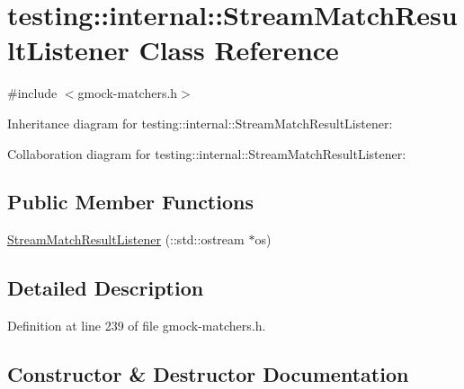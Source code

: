 \hypertarget{classtesting_1_1internal_1_1_stream_match_result_listener}{}\section{testing\+:\+:internal\+:\+:Stream\+Match\+Result\+Listener Class Reference}
\label{classtesting_1_1internal_1_1_stream_match_result_listener}


{\ttfamily \#include $<$gmock-\/matchers.\+h$>$}



Inheritance diagram for testing\+:\+:internal\+:\+:Stream\+Match\+Result\+Listener\+:


Collaboration diagram for testing\+:\+:internal\+:\+:Stream\+Match\+Result\+Listener\+:
\subsection*{Public Member Functions}
\begin{DoxyCompactItemize}
\item 
\hyperlink{classtesting_1_1internal_1_1_stream_match_result_listener_a81985760741d818745237df002d65d04}{Stream\+Match\+Result\+Listener} (\+::std\+::ostream $\ast$os)
\end{DoxyCompactItemize}


\subsection{Detailed Description}


Definition at line 239 of file gmock-\/matchers.\+h.



\subsection{Constructor \& Destructor Documentation}
